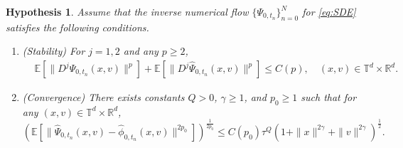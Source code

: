 \documentclass[11pt,reqno]{amsproc}
\newtheorem{hypothesis}[Def]{Hypothesis}
\newcommand{\R}{\mathbb{R}}
\numberwithin{equation}{section}
\newcommand{\E}{\mathbb{E}}\allowdisplaybreaks[4]
\begin{document}
\begin{hypothesis}\label{Asp:2}
Assume that the inverse numerical flow $\{\Psi_{0,t_n}\}_{n=0}^N$ for \eqref{eq:SDE} satisfies the following conditions. 
\begin{enumerate}
\item[(1)] (Stability) For $j=1,2$ and any $p\ge2$,
\begin{align*}
&\E\left[\|D^j\Psi_{0,t_n}(x,v)\|^p\right]+\E\left[\|D^j\widehat{\Psi}_{0,t_n}(x,v)\|^p\right]\le C(p),\quad (x,v)\in\mathbb{T}^d\times \R^{d}.
\end{align*}
\item[(2)] (Convergence)
There exists  constants $Q>0$, $\gamma\ge 1$, and $p_0\ge 1$ such that for any $(x,v)\in\mathbb{T}^d\times \R^{d}$,
\begin{equation*}
\left(\E\left[\|\widehat{\Psi}_{0,t_n}(x,v)-\widehat{\phi}_{0,t_n}(x,v)\|^{2p_0}\right]\right)^{\frac{1}{2p_0}}\le C(p_0)\tau^{Q}(1+\|x\|^{2\gamma}+\|v\|^{2\gamma})^{\frac12}.
\end{equation*}
\end{enumerate}
\end{hypothesis}
\end{document}
